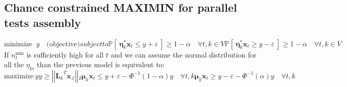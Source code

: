 \subsection{Chance constrained MAXIMIN for parallel tests assembly}
\begin{subequations}
	\begin{equation}
	\mbox{minimize } \ y \quad \mbox{(objective)}
	\end{equation}	
	subject to
	\begin{equation}\label{eq:CC1}
	\mathbb{P} \left[ \ \boldsymbol{\eta}^*_{k} \boldsymbol{x}_{t}  \leq  y +\varepsilon \ \right ] \geq 1- \alpha
	\quad \forall t,k \in V \end{equation}
	\begin{equation}\label{eq:CC2}
	\mathbb{P} \left[ \ \boldsymbol{\eta}^*_{k} \boldsymbol{x}_{t}  \geq y -\varepsilon\ \right] \geq 1- \alpha \quad \forall t,k \in V
	\end{equation}
\end{subequations}
If $n^{\min}_t$ is sufficiently high for all $t$ and we can assume the normal distribution for all the $\eta_{ki}$ than the previous model is equivalent to:
\begin{subequations}
	\begin{equation}
	\text{maximize} \ y
	\end{equation}
	\begin{equation}
	y \geq \left| \left| {\boldsymbol{L}_k}^T \boldsymbol{x}_{.t}\right| \right|{}_2 
	\end{equation}
		\begin{equation}
		\boldsymbol{\mu}_k \boldsymbol{x}_t \leq y + \varepsilon - \Phi^{-1}(1-\alpha)y \quad \forall t,k
		\end{equation}
		\begin{equation}
		\boldsymbol{\mu}_k \boldsymbol{x}_t \geq y - \varepsilon - \Phi^{-1}(\alpha)y \quad \forall t,k
		\end{equation}

	\label{eq:CCeqTIF}
\end{subequations}
